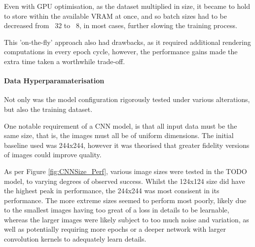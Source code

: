                         Even with GPU optimisation, as the dataset multiplied in size, it became to hold to store within the available VRAM at once, and so batch sizes had to be decreased from ~32 to ~8, in most cases, further slowing the training process.
    
                        This 'on-the-fly' approach also had drawbacks, as it required additional rendering computations in every epoch cycle, however, the performance gains made the extra time taken a worthwhile trade-off.
        
                    \paragraph{Data Hyperparamaterisation}
    
                        Not only was the model configuration rigorously tested under various alterations, but also the training dataset.
    
                        One notable requirement of a CNN model, is that all input data must be the same size, that is, the images must all be of uniform dimensions. The initial baseline used was 244x244, however it was theorised that greater fidelity versions of images could improve quality.
    
                        As per Figure \ref{fig:CNNSize_Perf}, various image sizes were tested in the TODO model, to varying degrees of observed success. Whilst the 124x124 size did have the highest peak in performance, the 244x244 was most consisent in its performance. The more extreme sizes seemed to perform most poorly, likely due to the smallest images having too great of a loss in details to be learnable, whereas the larger images were likely subject to too much noise and variation, as well as potentially requiring more epochs or a deeper network with larger convolution kernels to adequately learn details.
            
